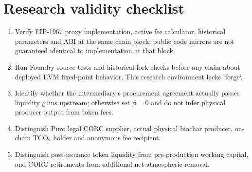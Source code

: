 \documentclass[11pt]{article}
\begin{document}
\section{Research validity checklist}
\begin{enumerate}
\item Verify EIP-1967 proxy implementation, active fee calculator, historical parameters and ABI at the same chain block; public code mirrors are not guaranteed identical to implementation at that block.
\item Run Foundry source tests and historical fork checks before any claim about deployed EVM fixed-point behavior. This research environment lacks `forge`.
\item Identify whether the intermediary's procurement agreement actually passes liquidity gains upstream; otherwise set $\beta=0$ and do not infer physical producer output from token fees.
\item Distinguish Puro legal CORC supplier, actual physical biochar producer, on-chain TCO$_2$ holder and anonymous fee recipient.
\item Distinguish post-issuance token liquidity from pre-production working capital, and CORC retirements from additional net atmospheric removal.
\end{enumerate}
\end{document}
